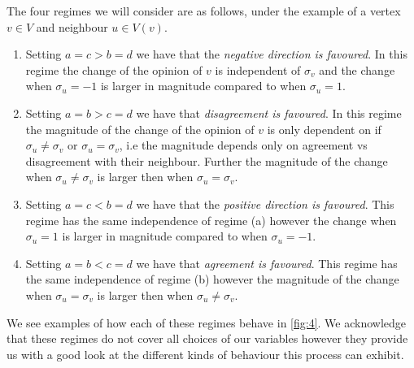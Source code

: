 The four regimes we will consider are as follows, under the example of a vertex \(v\in V\) and neighbour \(u\in V(v)\).
\begin{enumerate}[label=(\alph*)]
	\item Setting \(a=c > b=d\) we have that the \emph{negative direction is favoured}. 
	In this regime the change of the opinion of \(v\) is independent of \(\sigma_v\) and the change when \(\sigma_u=-1\) is larger in magnitude compared to when \(\sigma_u=1\).
\item Setting \(a=b>c=d\) we have that \emph{disagreement is favoured}.
		In this regime the magnitude of the change of the opinion of \(v\) is only dependent on if \(\sigma_u\ne \sigma_v\) or \(\sigma_u=\sigma_v\), i.e the magnitude depends only on agreement vs disagreement with their neighbour.
		Further the magnitude of the change when \(\sigma_u\ne \sigma_v\) is larger then when \(\sigma_u=\sigma_v\).
	\item Setting \(a=c<b=d\) we have that the \emph{positive direction is favoured}.
		This regime has the same independence of regime (a) however the change when \(\sigma_u=1\) is larger in magnitude compared to when \(\sigma_u=-1\).
	\item Setting \(a=b<c=d\) we have that \emph{agreement is favoured}.
		This regime has the same independence of regime (b) however the magnitude of the change when \(\sigma_u=\sigma_v\) is larger then when \(\sigma_u\ne \sigma_v\).
\end{enumerate}
We see examples of how each of these regimes behave in \cref{fig:4}.
We acknowledge that these regimes do not cover all choices of our variables however they provide us with a good look at the different kinds of behaviour this process can exhibit.


